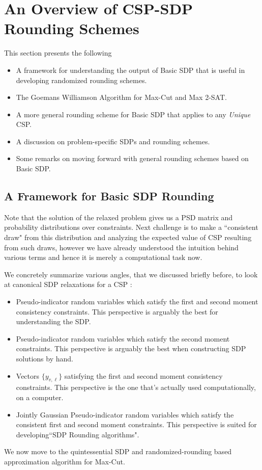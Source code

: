 \section{An Overview of CSP-SDP Rounding Schemes}\label{sec:rounding}
This section presents the following
\begin{itemize}
\item A framework for understanding the output of Basic SDP that is useful in developing randomized rounding schemes. 
\item The Goemans Williamson Algorithm for Max-Cut and Max 2-SAT.
\item A more general rounding scheme for Basic SDP that applies to any \textit{Unique} CSP.
\item A discussion on problem-specific SDPs and rounding schemes.
\item Some remarks on moving forward with general rounding schemes based on Basic SDP.
\end{itemize}

\subsection{A Framework for Basic SDP Rounding} 
Note that the solution of the relaxed problem gives us a PSD matrix and probability distributions over constraints. 
Next challenge is to make a ``consistent draw" from this distribution and analyzing the expected value of CSP resulting from such draws, 
however we have already understood the intuition behind various terms and hence it is merely a computational task now.  

We concretely summarize various angles, that we discussed briefly before, to look at canonical SDP relaxations for a CSP :
\begin{itemize}
\item Pseudo-indicator random variables which satisfy the first and second moment consistency constraints. 
This perspective is arguably the best for understanding the SDP. 
\item Pseudo-indicator random variables which satisfy the second moment constraints. 
This perspective is arguably the best when constructing SDP solutions by hand.
\item Vectors $\{ y_{v, \ell} \}$ satisfying the first and second moment consistency constraints.  
This perspective is the one that's actually used computationally, on a computer. 
\item Jointly Gaussian Pseudo-indicator random variables which satisfy the consistent first and second moment constraints. 
This perspective is suited for developing``SDP Rounding algorithms". 
\end{itemize}
We now move to the quintessential SDP and randomized-rounding based approximation algorithm for Max-Cut.

